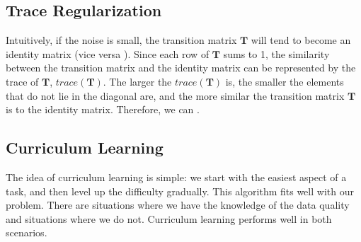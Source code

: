 \subsection{Trace Regularization}
Intuitively, if the noise is small, the transition matrix $\mathbf{T}$ will tend to become an identity matrix (vice versa ).  Since each row of $\mathbf{T}$ sums to 1, the similarity between the transition matrix and the identity matrix can be represented by the trace of $\mathbf{T}$, $trace(\mathbf{T})$. The larger the $trace(\mathbf{T})$ is, the smaller the elements that do not lie in the diagonal are, and the more similar the transition matrix $\mathbf{T}$ is to the identity matrix. Therefore, we can . 

\subsection{Curriculum Learning}
The idea of curriculum learning is simple: we start with the easiest aspect of a task, and then level up the difficulty gradually.
This algorithm fits well with our problem.
There are situations where we have the knowledge of the data quality and situations where we do not. Curriculum learning performs
well in both scenarios.    


